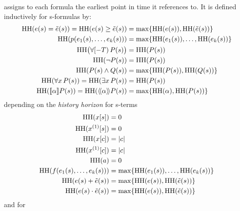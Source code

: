         \begin{definition}
            assigns to each \ddL formula the earliest point in time it references to.
            It is defined inductively for s-formulas by:
            \begin{align*}
                \HH{\astrm(s)=\bstrm(s)} = \HH{\astrm(s)\geq\bstrm(s)} &= \max\set{\HH{\astrm(s)},\HH{\bstrm(s)}}\\
                \HH{p(\range{\istrm{1}(s)}{\istrm{k}(s)})} &= \max\set{\range{\HH{\istrm{1}(s)}}{\HH{\istrm{k}(s)}}}\\
                \HH[\big]{\hs{\asfml(s)}} &= \HH{\asfml(s)}\\
                \HH{\lnot\asfml(s)} &= \HH{\asfml(s)}\\
                \HH{\asfml(s)\land\bsfml(s)} &= \max\set{\HH{\asfml(s)},\HH{\bsfml(s)}}\\
                \HH{\lforall{x}{\asfml(s)}} = \HH{\lexists{x}{\asfml(s)}} &= \HH{\asfml(s)}\\
                \HH{\dbox{\asprg}{\asfml(s)}} = \HH{\ddiamond{\asprg}{\asfml(s)}} &= \max\set{\HH{\asprg},\HH{\asfml(s)}}\\
            \end{align*}
            depending on the \emph{history horizon} for s-terms
            \begin{align*}
                \HH{\x[s]} &= 0\\
                \HH{\Dx[s]} &= 0\\
                \HH{\x[c]} &= \abs{c}\\
                \HH{\Dx[c]} &= \abs{c}\\
                \HH{a} &= 0\\
                \HH{f(\range{\istrm{1}(s)}{\istrm{k}(s)})} &= \max\set{\range{\HH{\istrm{1}(s)}}{\HH{\istrm{k}(s)}}}\\
                \HH{\astrm(s)+\bstrm(s)} &= \max\set{\HH{\astrm(s)},\HH{\bstrm(s)}}\\
                \HH{\astrm(s)\cdot\bstrm(s)} &= \max\set{\HH{\astrm(s)},\HH{\bstrm(s)}}
            \end{align*}
            and for \dHPs
            \begin{align*}

\end{align*}
\end{definition}
